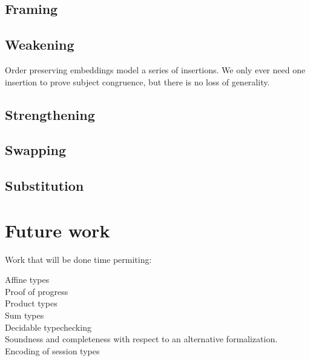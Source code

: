 \documentclass[a4paper,UKenglish,cleveref, autoref, thm-restate,authorcolumns]{lipics-v2019}
\begin{document}
\subsection{Framing}


\subsection{Weakening}

Order preserving embeddings model a series of insertions. We only ever need one insertion to prove subject congruence, but there is no loss of generality.

\subsection{Strengthening}

\subsection{Swapping}

\subsection{Substitution}

\section{Future work}

Work that will be done time permiting:

\begin{description}

\item [Affine types]
  
\item [Proof of progress]

\item [Product types]

\item [Sum types]

\item [Decidable typechecking]

\item [Soundness and completeness with respect to an alternative formalization.]

\item [Encoding of session types]

\end{description}



\end{document}
